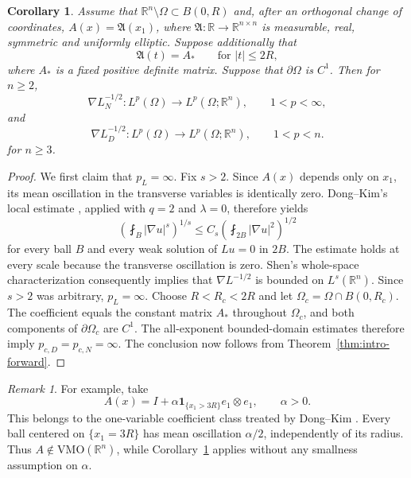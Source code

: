 \documentclass[12pt]{amsart}
\newtheorem{corollary}[theorem]{Corollary}
\theoremstyle{remark}
\newtheorem{remark}[theorem]{Remark}
\begin{document}
\begin{corollary}\label{cor:layered}
Assume that $\mathbb R^n\setminus\Omega\subset B(0,R)$ and, after an orthogonal change of coordinates, $A(x)=\mathfrak A(x_1)$, where $\mathfrak A:\mathbb R\to\mathbb R^{n\times n}$ is measurable,
real, symmetric and uniformly elliptic.  Suppose additionally that
\[
 \mathfrak A(t)=A_*
 \qquad\text{for } |t|\le 2R,
\]
where $A_*$ is a fixed positive definite matrix. Suppose that $\partial\Omega$ is $C^1$. Then for $n\ge 2$,
\[
 \nabla L_N^{-1/2}:L^p(\Omega)\longrightarrow
 L^p(\Omega;\mathbb R^n),
 \qquad 1<p<\infty,
\]
and
\[
 \nabla L_D^{-1/2}:L^p(\Omega)\longrightarrow
 L^p(\Omega;\mathbb R^n),
 \qquad 1<p<n.
\]
for $n\ge3$.
\end{corollary}

\begin{proof}
We first claim that $p_L=\infty$.  Fix $s>2$.  Since $A(x)$ depends only on $x_1$, its mean oscillation in the transverse variables is identically zero.  Dong--Kim's local estimate \cite[Corollary~8.3]{DK10}, applied with $q=2$ and $\lambda=0$, therefore yields
\[
 \left(\fint_B|\nabla u|^s\right)^{1/s}
 \le C_s
 \left(\fint_{2B}|\nabla u|^2\right)^{1/2}
\]
for every ball $B$ and every weak solution of $Lu=0$ in $2B$. The estimate holds at every scale because the transverse oscillation is zero.  Shen's whole-space characterization \cite[Theorem~A]{Shen05} consequently implies that $\nabla L^{-1/2}$ is bounded on $L^s(\mathbb R^n)$.  Since $s>2$ was arbitrary, $p_L=\infty$. Choose $R<R_c<2R$ and let $\Omega_c=\Omega\cap B(0,R_c)$. The coefficient equals the constant matrix $A_*$ throughout $\Omega_c$, and both components of $\partial\Omega_c$ are $C^1$. The all-exponent bounded-domain estimates therefore imply $p_{c,D}=p_{c,N}=\infty$. The conclusion now follows from Theorem~\ref{thm:intro-forward}.
\end{proof}



\begin{remark}
For example, take
\[
 A(x)=I+\alpha\mathbf 1_{\{x_1>3R\}}e_1\otimes e_1,
 \qquad \alpha>0.
\]
This belongs to the one-variable coefficient class treated by
Dong--Kim \cite[Theorem~2.2(iii)]{DK10}.
Every ball centered on $\{x_1=3R\}$ has mean oscillation
$\alpha/2$, independently of its radius. Thus
$A\notin\mathrm{VMO}(\mathbb R^n)$, while
Corollary~\ref{cor:layered} applies without any smallness
assumption on $\alpha$.
\end{remark}
\end{document}
